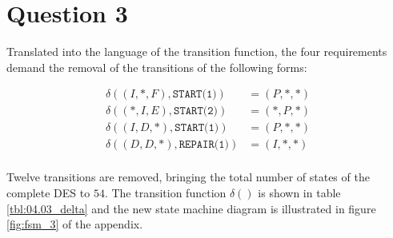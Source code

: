 \section{Question 3}

Translated into the language of the transition function, the four requirements
demand the removal of the transitions of the following forms:

\begin{align*}
  \delta((I,*,F), \texttt{START(1)}) &= (P,*,*) \\
  \delta((*,I,E), \texttt{START(2)}) &= (*,P,*) \\
  \delta((I,D,*), \texttt{START(1)}) &= (P,*,*) \\
  \delta((D,D,*), \texttt{REPAIR(1)}) &= (I,*,*) \\
\end{align*}

Twelve transitions are removed, bringing the total number of states of the
complete DES to $54$. The transition function $\delta()$ is shown in table
\ref{tbl:04.03_delta} and the new state machine diagram is illustrated in figure
\ref{fig:fsm_3} of the appendix.

